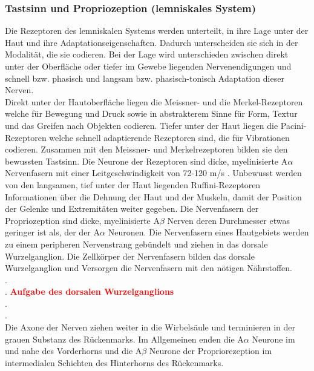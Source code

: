 \documentclass[12pt,a4paper,pdftex]{article}
\begin{document}
\subsubsection{Tastsinn und Propriozeption (lemniskales System)}
Die Rezeptoren des lemniskalen Systems werden unterteilt, in ihre Lage unter der Haut und ihre Adaptationseigenschaften. Dadurch unterscheiden sie sich in der Modalität, die sie codieren. Bei der Lage wird unterschieden zwischen direkt unter der Oberfläche oder tiefer im Gewebe liegenden Nervenendigungen und schnell bzw. phasisch und langsam bzw. phasisch-tonisch Adaptation dieser Nerven.\\
Direkt unter der Hautoberfläche liegen die Meissner- und die Merkel-Rezeptoren welche für Bewegung und Druck sowie in abstrakterem Sinne für Form, Textur und das Greifen nach Objekten codieren. \cite[Kap.~24]{paxinos2014rat} Tiefer unter der Haut liegen die Pacini-Rezeptoren welche schnell adaptierende Rezeptoren sind, die für Vibrationen codieren. Zusammen mit den Meissner- und Merkelrezeptoren bilden sie den bewussten Tastsinn. Die Neurone der Rezeptoren sind dicke, myelinisierte A$\alpha$ Nervenfasern mit einer Leitgeschwindigkeit von 72-120 m/s \cite[Kap.~22]{kandel2013principles}. Unbewusst werden von den langsamen, tief unter der Haut liegenden Ruffini-Rezeptoren Informationen über die Dehnung der Haut und der Muskeln, damit der Position der Gelenke und Extremitäten weiter gegeben.
Die Nervenfasern der Propriozeption sind dicke, myelinisierte A$\beta$ Nerven deren Durchmesser etwas geringer ist als, der der A$\alpha$ Neuronen.
Die Nervenfasern eines Hautgebiets werden zu einem peripheren Nervenstrang gebündelt und ziehen in das dorsale Wurzelganglion. Die Zellkörper der Nervenfasern bilden das dorsale Wurzelganglion und Versorgen die Nervenfasern mit den nötigen Nährstoffen. 
\\.\\. \textcolor{red}{\textbf{Aufgabe des dorsalen Wurzelganglions}}
\\.\\.\\
Die Axone der Nerven ziehen weiter in die Wirbelsäule und terminieren in der grauen Substanz des Rückenmarks. Im Allgemeinen enden die A$\alpha$ Neurone im und nahe des Vorderhorns und die A$\beta$ Neurone der Propriorezeption im intermedialen Schichten des Hinterhorns des Rückenmarks.
\end{document}
